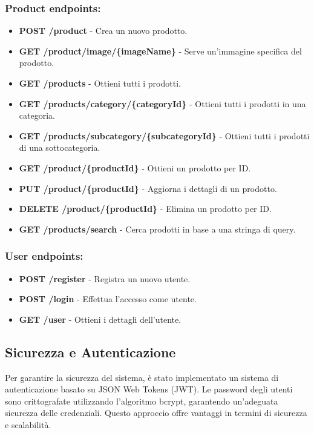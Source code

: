 \subsubsection{Product endpoints:}
\begin{itemize}
    \item \textbf{POST /product} - Crea un nuovo prodotto.
    \item \textbf{GET /product/image/\{imageName\}} - Serve un'immagine specifica del prodotto.
    \item \textbf{GET /products} - Ottieni tutti i prodotti.
    \item \textbf{GET /products/category/\{categoryId\}} - Ottieni tutti i prodotti in una categoria.
    \item \textbf{GET /products/subcategory/\{subcategoryId\}} - Ottieni tutti i prodotti di una sottocategoria.
    \item \textbf{GET /product/\{productId\}} - Ottieni un prodotto per ID.
    \item \textbf{PUT /product/\{productId\}} - Aggiorna i dettagli di un prodotto.
    \item \textbf{DELETE /product/\{productId\}} - Elimina un prodotto per ID.
    \item \textbf{GET /products/search} - Cerca prodotti in base a una stringa di query.
\end{itemize}

\subsubsection{User endpoints:}
\begin{itemize}
    \item \textbf{POST /register} - Registra un nuovo utente.
    \item \textbf{POST /login} - Effettua l'accesso come utente.
    \item \textbf{GET /user} - Ottieni i dettagli dell'utente.
\end{itemize}

\subsection{Sicurezza e Autenticazione}
Per garantire la sicurezza del sistema, è stato implementato un sistema di autenticazione basato su JSON Web Tokens (JWT). Le password degli utenti sono crittografate utilizzando l'algoritmo bcrypt, garantendo un'adeguata sicurezza delle credenziali. Questo approccio offre vantaggi in termini di sicurezza e scalabilità.


